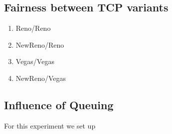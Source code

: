  \subsection{Fairness between TCP variants}
 \begin{enumerate}
\item Reno/Reno
\item NewReno/Reno
\item Vegas/Vegas
\item NewReno/Vegas
 \end{enumerate}
 \subsection{Influence of Queuing}
 
 For this experiment we set up 
